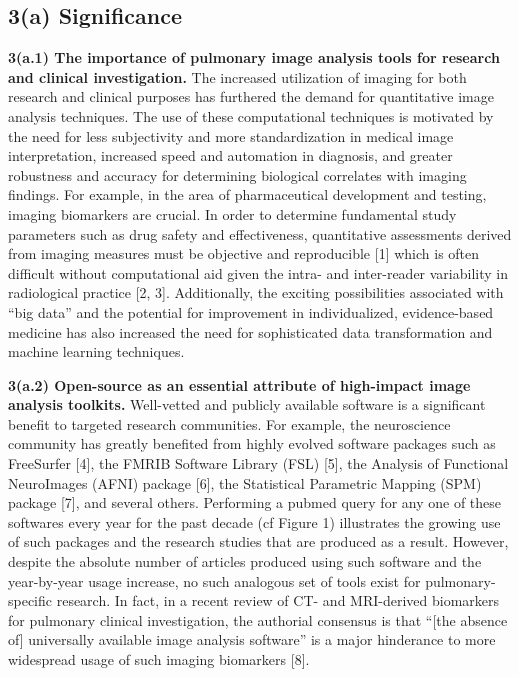 \documentclass[11pt,]{article}
\begin{document}
\subsection{\texorpdfstring{\textbf{3(a)
Significance}}{3(a) Significance}}\label{a-significance}

\textbf{3(a.1) The importance of pulmonary image analysis tools for
research and clinical investigation.} The increased utilization of
imaging for both research and clinical purposes has furthered the demand
for quantitative image analysis techniques. The use of these
computational techniques is motivated by the need for less subjectivity
and more standardization in medical image interpretation, increased
speed and automation in diagnosis, and greater robustness and accuracy
for determining biological correlates with imaging findings. For
example, in the area of pharmaceutical development and testing, imaging
biomarkers are crucial. In order to determine fundamental study
parameters such as drug safety and effectiveness, quantitative
assessments derived from imaging measures must be objective and
reproducible {[}1{]} which is often difficult without computational aid
given the intra- and inter-reader variability in radiological practice
{[}2, 3{]}. Additionally, the exciting possibilities associated with
``big data'' and the potential for improvement in individualized,
evidence-based medicine has also increased the need for sophisticated
data transformation and machine learning techniques.

\textbf{3(a.2) Open-source as an essential attribute of high-impact
image analysis toolkits.} Well-vetted and publicly available software is
a significant benefit to targeted research communities. For example, the
neuroscience community has greatly benefited from highly evolved
software packages such as FreeSurfer {[}4{]}, the FMRIB Software Library
(FSL) {[}5{]}, the Analysis of Functional NeuroImages (AFNI) package
{[}6{]}, the Statistical Parametric Mapping (SPM) package {[}7{]}, and
several others. Performing a pubmed query for any one of these softwares
every year for the past decade (cf Figure 1) illustrates the growing use
of such packages and the research studies that are produced as a result.
However, despite the absolute number of articles produced using such
software and the year-by-year usage increase, no such analogous set of
tools exist for pulmonary-specific research. In fact, in a recent review
of CT- and MRI-derived biomarkers for pulmonary clinical investigation,
the authorial consensus is that ``{[}the absence of{]} universally
available image analysis software'' is a major hinderance to more
widespread usage of such imaging biomarkers {[}8{]}.
\end{document}
